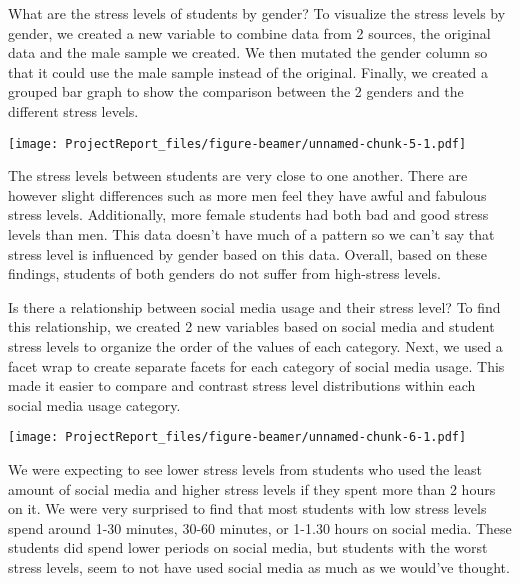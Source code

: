 \documentclass[
  ignorenonframetext,
]{beamer}
\begin{document}
\begin{frame}{What are the stress levels of students by gender?}
\protect\hypertarget{what-are-the-stress-levels-of-students-by-gender}{}
To visualize the stress levels by gender, we created a new variable to
combine data from 2 sources, the original data and the male sample we
created. We then mutated the gender column so that it could use the male
sample instead of the original. Finally, we created a grouped bar graph
to show the comparison between the 2 genders and the different stress
levels.

\texttt{[image: ProjectReport\_files/figure-beamer/unnamed-chunk-5-1.pdf]}

The stress levels between students are very close to one another. There
are however slight differences such as more men feel they have awful and
fabulous stress levels. Additionally, more female students had both bad
and good stress levels than men. This data doesn't have much of a
pattern so we can't say that stress level is influenced by gender based
on this data. Overall, based on these findings, students of both genders
do not suffer from high-stress levels.
\end{frame}

\begin{frame}{Is there a relationship between social media usage and
their stress level?}
\protect\hypertarget{is-there-a-relationship-between-social-media-usage-and-their-stress-level}{}
To find this relationship, we created 2 new variables based on social
media and student stress levels to organize the order of the values of
each category. Next, we used a facet wrap to create separate facets for
each category of social media usage. This made it easier to compare and
contrast stress level distributions within each social media usage
category.

\texttt{[image: ProjectReport\_files/figure-beamer/unnamed-chunk-6-1.pdf]}

We were expecting to see lower stress levels from students who used the
least amount of social media and higher stress levels if they spent more
than 2 hours on it. We were very surprised to find that most students
with low stress levels spend around 1-30 minutes, 30-60 minutes, or
1-1.30 hours on social media. These students did spend lower periods on
social media, but students with the worst stress levels, seem to not
have used social media as much as we would've thought.
\end{frame}
\end{document}
